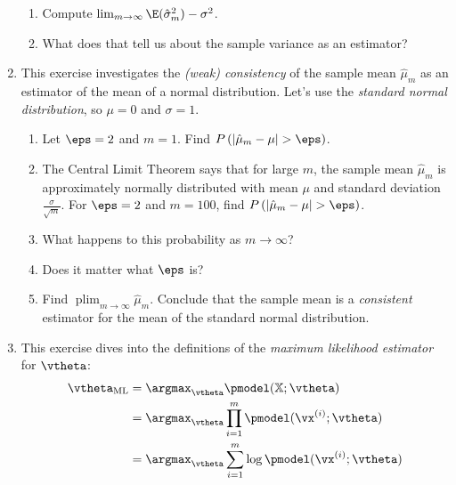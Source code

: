 \documentclass{article}
\DeclareMathOperator*{\plim}{plim}
\begin{document}
\begin{enumerate}
\begin{enumerate}
    \item Compute $\lim_{m\to\infty} \E(\hat{\sigma}_m^2) - \sigma^2$.
    \item What does that tell us about the sample variance as an estimator?
\end{enumerate}
    
\item \label{ML_ex_consistency} 
This exercise investigates the \emph{(weak) consistency} of the sample mean $\hat{\mu}_m$ as an estimator of the mean of a normal distribution. Let's use the \emph{standard normal distribution}, so $\mu = 0$ and $\sigma = 1$. 

\begin{enumerate}
    \item Let $\eps = 2$ and $m = 1$. Find $P\left(\lvert \hat{\mu}_m - \mu \rvert > \eps \right)$. 
    \item The Central Limit Theorem says that for large $m$, the sample mean $\hat{\mu}_m$ is approximately normally distributed with mean $\mu$ and standard deviation $\frac{\sigma}{\sqrt{m}}$. For $\eps = 2$ and $m = 100$, find $P\left(\lvert \hat{\mu}_m - \mu \rvert > \eps \right)$.
    \item What happens to this probability as $m \to \infty$? \item Does it matter what $\eps$ is?
    \item Find $\plim_{m\to\infty} \hat{\mu}_m$. Conclude that the sample mean is a \emph{consistent} estimator for the mean of the standard normal distribution. 
\end{enumerate}
    
\item \label{ML_ex_maximumlikelihood} 
This exercise dives into the definitions of the \emph{maximum likelihood estimator} for $\vtheta$:
\begin{align}
    \vtheta_\textnormal{ML} & = \argmax_\vtheta \pmodel(\mathbb{X}; \vtheta)                  \nonumber    \\
                           & = \argmax_\vtheta \prod_{i = 1}^m \pmodel(\vx^{(i)}; \vtheta)   \label{TMLdef1} \\
                           & = \argmax_\vtheta \sum_{i = 1}^m \log \pmodel(\vx^{(i)}; \vtheta)   \label{TMLdef2}
\end{align}


\end{enumerate}
\end{document}
